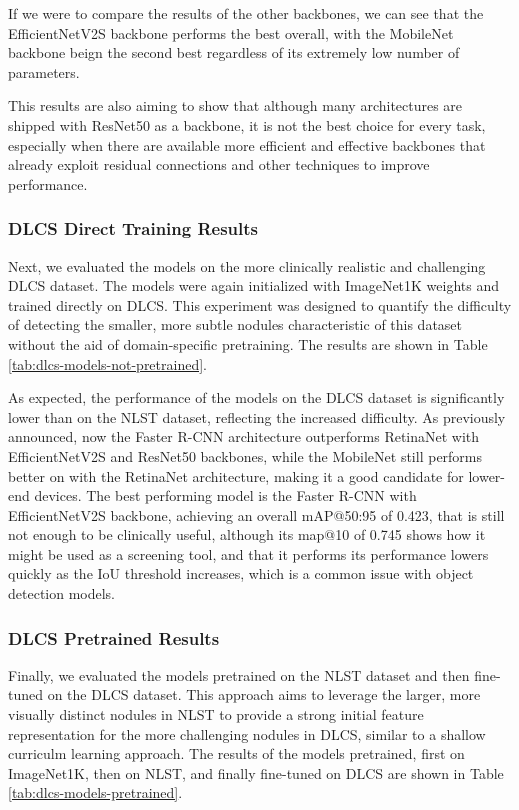 If we were to compare the results of the other backbones, we can see that the EfficientNetV2S backbone performs the best overall, with the MobileNet backbone beign the second best regardless of its extremely low number of parameters.

This results are also aiming to show that although many architectures are shipped with ResNet50 as a backbone, it is not the best choice for every task, especially when there are available more efficient and effective backbones that already exploit residual connections and other techniques to improve performance.

\subsubsection{DLCS Direct Training Results}
Next, we evaluated the models on the more clinically realistic and challenging DLCS dataset. The models were again initialized with ImageNet1K weights and trained directly on DLCS. This experiment was designed to quantify the difficulty of detecting the smaller, more subtle nodules characteristic of this dataset without the aid of domain-specific pretraining. The results are shown in Table \ref{tab:dlcs-models-not-pretrained}.



As expected, the performance of the models on the DLCS dataset is significantly lower than on the NLST dataset, reflecting the increased difficulty. As previously announced, now the Faster R-CNN architecture outperforms RetinaNet with EfficientNetV2S and ResNet50 backbones, while the MobileNet still performs better on with the RetinaNet architecture, making it a good candidate for lower-end devices.
The best performing model is the Faster R-CNN with EfficientNetV2S backbone, achieving an overall mAP@50:95 of 0.423, that is still not enough to be clinically useful, although its map@10 of 0.745 shows how it might be used as a screening tool, and that it performs its performance lowers quickly as the IoU threshold increases, which is a common issue with object detection models.

\subsubsection{DLCS Pretrained Results}
Finally, we evaluated the models pretrained on the NLST dataset and then fine-tuned on the DLCS dataset. This approach aims to leverage the larger, more visually distinct nodules in NLST to provide a strong initial feature representation for the more challenging nodules in DLCS, similar to a shallow curriculm learning approach.
The results of the models pretrained, first on ImageNet1K, then on NLST, and finally fine-tuned on DLCS are shown in Table \ref{tab:dlcs-models-pretrained}.

